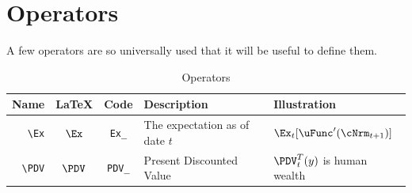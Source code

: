 \documentclass{econark}
\begin{document}
\hypertarget{Operators}{}
\section{Operators}
A few operators are so universally used that it will be useful to define them.

\begin{table}[ht]
  \centering
  \begin{tabular}{|>{\ttfamily}rccll|}
    \hline
    Name    & \LaTeX         & Code & Description & Illustration
    \\ \hline
    \verb|\Ex|        & $\Ex$       & \texttt{Ex\_} & The expectation as of date $t$ & $\Ex_{t}[\uFunc^{\prime}(\cNrm_{t+1})]$
    \\   \verb|\PDV|        & $\PDV$       & \texttt{PDV\_} & Present Discounted Value & $\PDV_{t}^{T}(y)$ is human wealth
    \\	\hline
  \end{tabular}
  \caption{Operators}
  \label{table:Operators}
\end{table}



\hypertarget{Modifiers}{}
\end{document}
